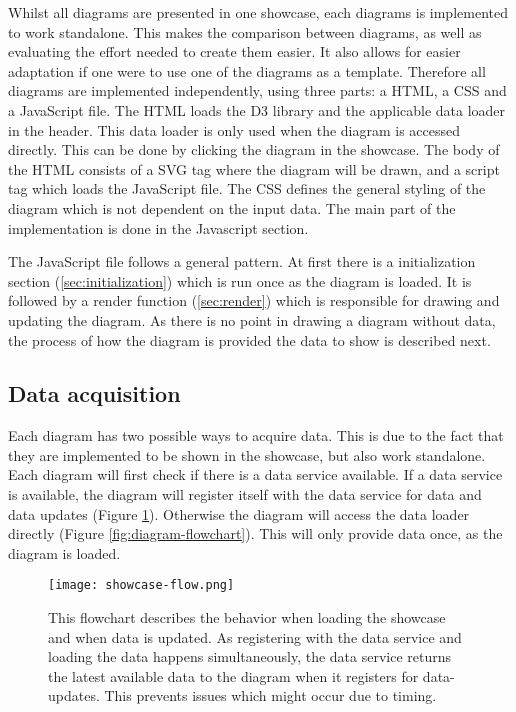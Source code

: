 Whilst all diagrams are presented in one showcase, each diagrams is implemented to work standalone. This makes the comparison between diagrams, as well as evaluating the effort needed to create them easier. It also allows for easier adaptation if one were to use one of the diagrams as a template. Therefore all diagrams are implemented independently, using three parts: a HTML, a CSS and a JavaScript file. The HTML loads the D3 library and the applicable data loader in the header. This data loader is only used when the diagram is accessed directly. This can be done by clicking the diagram in the showcase. The body of the HTML consists of a SVG tag where the diagram will be drawn, and a script tag which loads the JavaScript file. The CSS defines the general styling of the diagram which is not dependent on the input data. The main part of the implementation is done in the Javascript section.

The JavaScript file follows a general pattern. At first there is a initialization section (\ref{sec:initialization}) which is run once as the diagram is loaded. It is followed by a render function (\ref{sec:render}) which is responsible for drawing and updating the diagram. As there is no point in drawing a diagram without data, the process of how the diagram is provided the data to show is described next.

\subsection{Data acquisition} \label{sec:data-acquisition}
Each diagram has two possible ways to acquire data. This is due to the fact that they are implemented to be shown in the showcase, but also work standalone. Each diagram will first check if there is a data service available. If a data service is available, the diagram will register itself with the data service for data and data updates (Figure \ref{fig:showcase-flowchart}). Otherwise the diagram will access the data loader directly (Figure \ref{fig:diagram-flowchart}). This will only provide data once, as the diagram is loaded.

\begin{figure}[ht]
    \texttt{[image: showcase-flow.png]}
    \captionsetup{width=0.9\textwidth}
    \caption[showcase-flowchart]{This flowchart describes the behavior when loading the showcase and when data is updated. As registering with the data service and loading the data happens simultaneously, the data service returns the latest available data to the diagram when it registers for data-updates. This prevents issues which might occur due to timing.}
    \label{fig:showcase-flowchart}
\end{figure}

